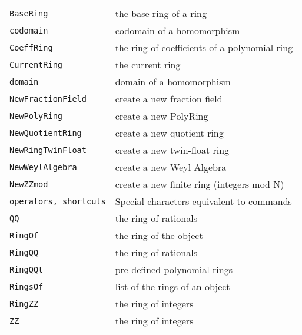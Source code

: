 \documentclass[a4paper]{mybook}
\begin{document}
\begin{center}
\begin{longtable}{ll}
   
{\verb~BaseRing~} &
      the base ring of a ring\\
   
{\verb~codomain~} &
      codomain of a homomorphism\\
   
{\verb~CoeffRing~} &
      the ring of coefficients of a polynomial ring\\
   
{\verb~CurrentRing~} &
      the current ring\\
   
{\verb~domain~} &
      domain of a homomorphism\\
   
{\verb~NewFractionField~} &
      create a new fraction field\\
   
{\verb~NewPolyRing~} &
      create a new PolyRing\\
   
{\verb~NewQuotientRing~} &
      create a new quotient ring\\
   
{\verb~NewRingTwinFloat~} &
      create a new twin-float ring\\
   
{\verb~NewWeylAlgebra~} &
      create a new Weyl Algebra\\
   
{\verb~NewZZmod~} &
      create a new finite ring (integers mod N)\\
   
{\verb~operators, shortcuts~} &
      Special characters equivalent to commands\\
   
{\verb~QQ~} &
      the ring of rationals\\
   
{\verb~RingOf~} &
      the ring of the object\\
   
{\verb~RingQQ~} &
      the ring of rationals\\
   
{\verb~RingQQt~} &
      pre-defined polynomial rings\\
   
{\verb~RingsOf~} &
      list of the rings of an object\\
   
{\verb~RingZZ~} &
      the ring of integers\\
   
{\verb~ZZ~} &
      the ring of integers\\
   
\end{longtable}
\end{center}
\end{document}
